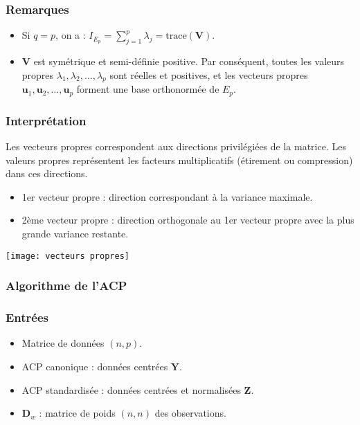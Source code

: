 \documentclass[10pt,a4paper]{article}
\begin{document}
\subsubsection*{Remarques}
\begin{itemize}
    \item Si $q = p$, on a : $I_{E_p} = \sum_{j=1}^p \lambda_j = \text{trace}(\mathbf{V})$.
    \item $\mathbf{V}$ est symétrique et semi-définie positive. Par conséquent, toutes les valeurs propres $\lambda_1, \lambda_2, \ldots, \lambda_p$ sont réelles et positives, et les vecteurs propres $\mathbf{u}_1, \mathbf{u}_2, \ldots, \mathbf{u}_p$ forment une base orthonormée de $E_p$.
\end{itemize}

\subsubsection*{Interprétation}
Les vecteurs propres correspondent aux directions privilégiées de la matrice. Les valeurs propres représentent les facteurs multiplicatifs (étirement ou compression) dans ces directions.
\begin{itemize}
    \item 1er vecteur propre : direction correspondant à la variance maximale.
    \item 2ème vecteur propre : direction orthogonale au 1er vecteur propre avec la plus grande variance restante.
\end{itemize}

\texttt{[image: vecteurs propres]}

\subsubsection*{Algorithme de l'ACP}
\subsubsection*{Entrées}
\begin{itemize}
    \item Matrice de données $(n, p)$.
    \item ACP canonique : données centrées $\mathbf{Y}$.
    \item ACP standardisée : données centrées et normalisées $\mathbf{Z}$.
    \item $\mathbf{D}_w$ : matrice de poids $(n, n)$ des observations.
\end{itemize}
\end{document}
